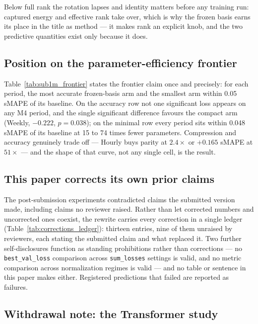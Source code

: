 Below full rank the rotation lapses and identity matters before any training
run: captured energy and effective rank take over, which is why the frozen
basis earns its place in the title as method --- it makes rank an explicit
knob, and the two predictive quantities exist only because it does.

\subsection{Position on the parameter-efficiency frontier}

Table~\ref{tab:sub1m_frontier} states the frontier claim once and precisely:
for each period, the most accurate frozen-basis arm and the smallest arm
within 0.05 sMAPE of its baseline. On the accuracy row not one significant
loss appears on any M4 period, and the single significant difference favours
the compact arm (Weekly, $-0.222$, $p = 0.038$); on the minimal row every
period sits within 0.048 sMAPE of its baseline at 15 to 74 times fewer
parameters. Compression and accuracy genuinely trade off --- Hourly buys
parity at $2.4\times$ or $+0.165$ sMAPE at $51\times$ --- and the shape of
that curve, not any single cell, is the result.

\subsection{This paper corrects its own prior claims}

The post-submission experiments contradicted claims the submitted version
made, including claims no reviewer raised. Rather than let corrected numbers
and uncorrected ones coexist, the rewrite carries every correction in a
single ledger (Table~\ref{tab:corrections_ledger}): thirteen entries, nine
of them unraised by reviewers, each stating the submitted claim and what
replaced it. Two further self-disclosures function as standing prohibitions
rather than corrections --- no \texttt{best\_val\_loss} comparison across
\texttt{sum\_losses} settings is valid, and no metric comparison across
normalization regimes is valid --- and no table or sentence in this paper
makes either. Registered predictions that failed are reported as failures.

\subsection{Withdrawal note: the Transformer study}

